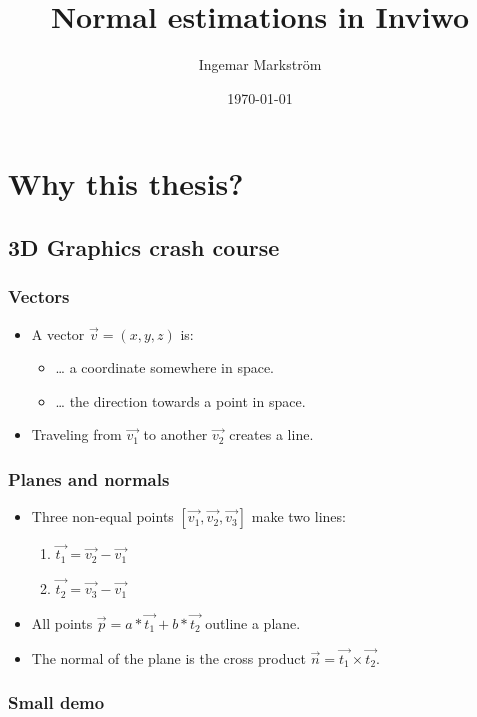 \documentclass[11pt]{article}
\author{Ingemar Markström}
\date{\today}
\title{Normal estimations in Inviwo}
\begin{document}
\maketitle

\section*{Why this thesis?}
\label{sec:org80cc558}

\subsection*{3D Graphics crash course}
\label{sec:org46b12d6}
\subsubsection*{Vectors}
\label{sec:org6a0341e}
\begin{itemize}
\item A vector \(\vec{v}=(x,y,z)\) is:
\begin{itemize}
\item \ldots{} a coordinate somewhere in space.
\item \ldots{} the direction towards a point in space.
\end{itemize}
\item Traveling from \(\vec{v_1}\) to another \(\vec{v_2}\) creates a line.
\end{itemize}

\subsubsection*{Planes and normals}
\label{sec:orgc820e23}
\begin{itemize}
\item Three non-equal points \([\vec{v_1}, \vec{v_2}, \vec{v_3}]\) make two lines:
\begin{enumerate}
\item \(\vec{t_1} = \vec{v_2}-\vec{v_1}\)
\item \(\vec{t_2} = \vec{v_3}-\vec{v_1}\)
\end{enumerate}
\item All points \(\vec{p} = a*\vec{t_1} + b*\vec{t_2}\) outline a plane.
\item The normal of the plane is the cross product \(\vec{n} = \vec{t_1} \times \vec{t_2}\).
\end{itemize}
\subsubsection*{Small demo}
\label{sec:org6544824}
\end{document}
